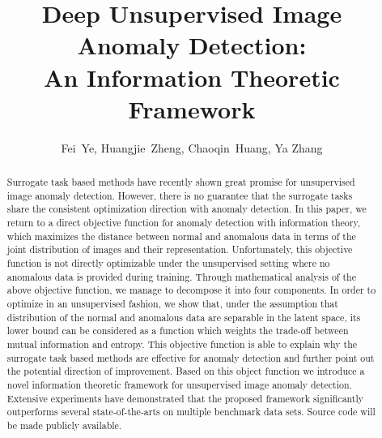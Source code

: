 \documentclass[journal]{IEEEtran}
\theoremstyle{remark}
\begin{document}
\title{Deep Unsupervised Image Anomaly Detection:\\ An Information Theoretic Framework}

\author{Fei~Ye,
        Huangjie~Zheng,
        Chaoqin~Huang,
        Ya Zhang
}


\maketitle

\begin{abstract}
Surrogate task based methods have recently shown great promise for unsupervised image anomaly detection. However, there is no guarantee that the surrogate tasks share the consistent optimization direction with anomaly detection. In this paper, we return to a direct objective function for anomaly detection with information theory, which maximizes the distance between normal and anomalous data in terms of the joint distribution of images and their representation. Unfortunately, this objective function is not directly optimizable under the unsupervised setting where no anomalous data is provided during training. Through mathematical analysis of the above objective function, we manage to decompose it into four components. In order to optimize in an unsupervised fashion, we show that, under the assumption that distribution of the normal and anomalous data are separable in the latent space, its lower bound can be considered as a function which weights the trade-off between mutual information and entropy. This objective function is able to explain why the surrogate task based methods are effective for anomaly detection and further point out the potential direction of improvement. Based on this object function we introduce a novel information theoretic framework for unsupervised image anomaly detection. Extensive experiments have demonstrated that the proposed framework significantly outperforms several state-of-the-arts on multiple benchmark data sets. Source code will be made publicly available.
\end{abstract}
\end{document}
